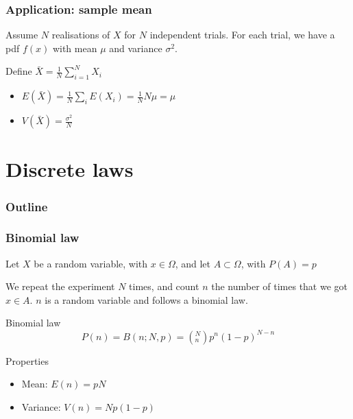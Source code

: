 \documentclass[9pt]{beamer}
\begin{document}
\begin{frame}
 \frametitle{Application: sample mean}
 
 
 
  Assume $N$ realisations of $X$ for $N$ independent trials. For each trial, we have a pdf $f(x)$ with mean $\mu$ and variance $\sigma^2$. 
  
  Define $\bar{X} = \frac{1}{N} \sum_{i=1}^{N} X_i$
  
  \begin{itemize}
   \item $E(\bar{X}) = \frac{1}{N} \sum_i E(X_i) = \frac{1}{N} N \mu = \mu$ 
   \item $V(\bar{X}) = \frac{\sigma^2}{N}$
  \end{itemize}
 

\end{frame}

\section{Discrete laws}

\begin{frame}
 \frametitle{Outline}
 
 \tableofcontents[current]
\end{frame}

\begin{frame}
 \frametitle{Binomial law}
 
 Let $X$ be a random variable, with $x \in \Omega$, and let $A \subset \Omega$, with $P(A) = p$
 
 We repeat the experiment $N$ times, and count $n$ the number of times that we got $x \in A$. $n$ is a random variable and follows a binomial law.
 
 \begin{block}{Binomial law}
  $$P(n) = B(n;N,p) = \left( ^N_n \right) p^n (1-p)^{N-n}$$
 \end{block}
 
 \begin{block}{Properties}
  \begin{itemize}
   \item Mean: $E(n) = pN$
   \item Variance: $V(n) = N p (1-p)$
  \end{itemize}
 \end{block}

\end{frame}
\end{document}

